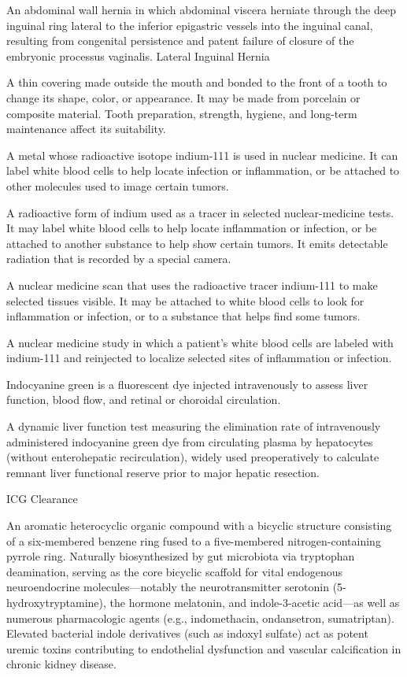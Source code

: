  An abdominal wall hernia in which abdominal viscera herniate through the deep inguinal ring lateral to the inferior epigastric vessels into the inguinal canal, resulting from congenital persistence and patent failure of closure of the embryonic processus vaginalis.
\synonyms
Lateral Inguinal Hernia

 A thin covering made outside the mouth and bonded to the front of a tooth to change its shape, color, or appearance. It may be made from porcelain or composite material. Tooth preparation, strength, hygiene, and long-term maintenance affect its suitability.

 A metal whose radioactive isotope indium-111 is used in nuclear medicine. It can label white blood cells to help locate infection or inflammation, or be attached to other molecules used to image certain tumors.

 A radioactive form of indium used as a tracer in selected nuclear-medicine tests. It may label white blood cells to help locate inflammation or infection, or be attached to another substance to help show certain tumors. It emits detectable radiation that is recorded by a special camera.

 A nuclear medicine scan that uses the radioactive tracer indium-111 to make selected tissues visible. It may be attached to white blood cells to look for inflammation or infection, or to a substance that helps find some tumors.

 A nuclear medicine study in which a patient’s white blood cells are labeled with indium-111 and reinjected to localize selected sites of inflammation or infection.

 Indocyanine green is a fluorescent dye injected intravenously to assess liver function, blood flow, and retinal or choroidal circulation.

 A dynamic liver function test measuring the elimination rate of intravenously administered indocyanine green dye from circulating plasma by hepatocytes (without enterohepatic recirculation), widely used preoperatively to calculate remnant liver functional reserve prior to major hepatic resection.

\synonyms
ICG Clearance

 An aromatic heterocyclic organic compound with a bicyclic structure consisting of a six-membered benzene ring fused to a five-membered nitrogen-containing pyrrole ring. Naturally biosynthesized by gut microbiota via tryptophan deamination, serving as the core bicyclic scaffold for vital endogenous neuroendocrine molecules---notably the neurotransmitter serotonin (5-hydroxytryptamine), the hormone melatonin, and indole-3-acetic acid---as well as numerous pharmacologic agents (e.g., indomethacin, ondansetron, sumatriptan). Elevated bacterial indole derivatives (such as indoxyl sulfate) act as potent uremic toxins contributing to endothelial dysfunction and vascular calcification in chronic kidney disease.

